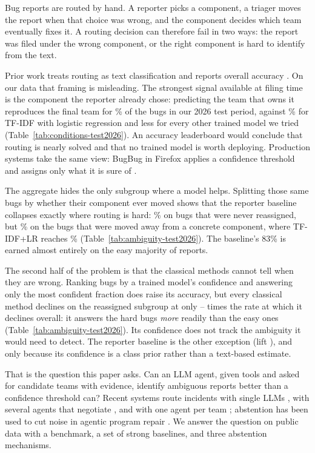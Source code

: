 \documentclass[sigconf,anonymous]{acmart}
\begin{document}
Bug reports are routed by hand. A reporter picks a component, a triager moves the report when
that choice was wrong, and the component decides which team eventually fixes it. A routing
decision can therefore fail in two ways: the report was filed under the wrong component, or the
right component is hard to identify from the text.

Prior work treats routing as text classification and reports overall accuracy
\cite{sarkar2019ericsson,su2021bugtossing,dipongkor2023comparative,su2023stillconfusing,mamun2026triagerx}.
On our data that framing is misleading. The strongest signal available at filing time is the
component the reporter already chose: predicting the team that owns it reproduces the final team
for \nRepAcc\% of the bugs in our 2026 test period, against \nLrAcc\% for TF-IDF with logistic
regression and less for every other trained model we tried
(Table~\ref{tab:conditions-test2026}). An accuracy leaderboard would conclude that routing is
nearly solved and that no trained model is worth deploying. Production systems take the same
view: BugBug in Firefox applies a confidence threshold and assigns only what it is sure of
\cite{castelluccio2019bugbug}.

The aggregate hides the only subgroup where a model helps. Splitting those same bugs by whether
their component ever moved shows that the reporter baseline collapses exactly where routing is
hard: \nRepNeverAcc\% on bugs that were never reassigned, but \nRepSpecAcc\% on the bugs that were
moved away from a concrete component, where TF-IDF+LR reaches \nLrSpecAcc\%
(Table~\ref{tab:ambiguity-test2026}). The baseline's 83\% is earned almost entirely on the easy
majority of reports.

The second half of the problem is that the classical methods cannot tell when they are wrong.
Ranking bugs by a trained model's confidence and answering only the most confident fraction does
raise its accuracy, but every classical method declines on the reassigned subgroup at only
\nClassicalLiftMin--\nClassicalLiftMax{} times the rate at which it declines overall: it answers the hard bugs \emph{more}
readily than the easy ones (Table~\ref{tab:ambiguity-test2026}). Its confidence does not track the
ambiguity it would need to detect. The reporter baseline is the other exception (lift \nRepLift), and
only because its confidence is a class prior rather than a text-based estimate.

That is the question this paper asks. Can an LLM agent, given tools and asked for candidate teams
with evidence, identify ambiguous reports better than a confidence threshold can? Recent systems
route incidents with single LLMs \cite{wang2024comet}, with several agents that negotiate
\cite{yu2025triangle}, and with one agent per team \cite{yao2026agentic}; abstention has been used
to cut noise in agentic program repair \cite{cambronero2026abstain}. We answer the question on
public data with a benchmark, a set of strong baselines, and three abstention mechanisms.
\end{document}
